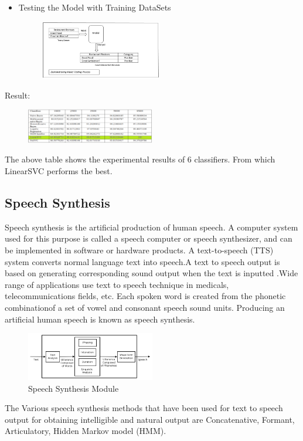 \documentclass[conference]{IEEEtran}
\begin{document}
{\begin{itemize}
\begin{figure}[!ht]
	\end{figure}
	\item Testing the Model with Training DataSets 
	\begin{figure}[!ht]
		\centering
		\includegraphics[width=0.5\textwidth]{test.png}
	\end{figure}
\end{itemize}
Result:
	\begin{figure}[!ht]
	\centering
	\includegraphics[width=0.5\textwidth]{result.png}
\end{figure}
The above table shows the experimental results of 6 classifiers. From which LinearSVC performs the best.

\subsection{\textbf{Speech Synthesis}}
Speech synthesis is the artificial production of human speech. A computer system used for this purpose is called a speech computer or speech synthesizer, and can be implemented in software or hardware products. A text-to-speech (TTS) system converts normal language text into speech.A text to speech output is based on generating corresponding sound output when the text is inputted \cite{b11}.Wide range of applications use text to speech technique in medicals, telecommunications fields, etc. Each spoken word is created from the phonetic combinationof a set of vowel and consonant speech sound units. Producing an artificial human speech is known as speech synthesis.  
\begin{figure}[!ht]
	\centering
	\includegraphics[width=0.5\textwidth]{SpSy.png}
	\caption{Speech Synthesis Module\cite{b12}}
\end{figure}
The Various speech synthesis methods that have been used for text to speech output for obtaining intelligible and natural output are Concatenative, Formant, Articulatory, Hidden Markov model (HMM). 


}
\end{document}
